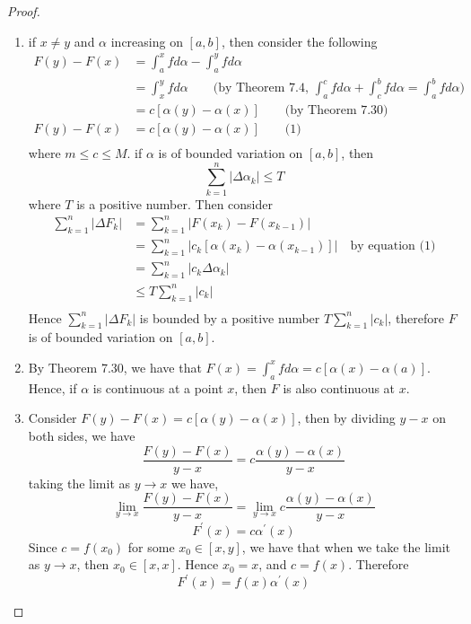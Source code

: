 \documentclass[aps,pra,notitlepage,amsmath,amssymb,letterpaper,12pt]{revtex4-1}
\begin{document}
\begin{proof}
\begin{enumerate}[\upshape a)]
\item if $x \ne y$ and $\alpha$ increasing on $[a,b]$, then consider the following
\begin{equation}
  \begin{split}
   F(y) - F(x)
   &= \int_{a}^{x} f d \alpha - \int_{a}^{y} f d \alpha \nonumber\\
   &= \int_{x}^{y} f d \alpha \qquad \textrm{(by Theorem 7.4, } \int_{a}^{c} f d \alpha + \int_{c}^{b} f d \alpha = \int_{a}^{b} f d \alpha) \nonumber \\
   &= c[\alpha(y) - \alpha(x)] \qquad \textrm{(by Theorem 7.30)}\\
   F(y) - F(x) &=  c[\alpha(y) - \alpha(x)] \qquad \textrm{(1)}\\
  \end{split}
 \end{equation}
where $m \leq c \leq M$. if $\alpha$ is of bounded variation on $[a,b]$, then
$$\sum_{k=1}^{n} \left| \Delta \alpha_{k} \right| \leq T$$
where $T$ is a positive number. Then consider
\begin{equation}
  \begin{split}
  \sum_{k=1}^{n} \left| \Delta F_{k} \right|
  &= \sum_{k=1}^{n} \left| F(x_{k})-F(x_{k-1}) \right| \nonumber\\
  &= \sum_{k=1}^{n} \left| c_{k}[\alpha(x_{k}) - \alpha(x_{k-1})] \right| \quad \textrm{by equation (1)} \\
  &= \sum_{k=1}^{n} \left| c_{k}\Delta \alpha_{k} \right| \\
  &\leq T\sum_{k=1}^{n} \left| c_{k} \right| \\
  \end{split}
\end{equation}
Hence $\sum_{k=1}^{n} \left| \Delta F_{k} \right|$ is bounded by a positive number $T\sum_{k=1}^{n} \left| c_{k} \right|$, therefore $F$ is of bounded variation on $[a,b]$.
\item By Theorem 7.30, we have that $F(x)=\int_{a}^{x} f d \alpha =  c[\alpha(x) - \alpha(a)]$. Hence, if $\alpha$ is continuous at a point $x$, then $F$ is also continuous at $x$.
\item Consider $F(y) - F(x) =  c[\alpha(y) - \alpha(x)]$, then by dividing $y-x$ on both sides, we have
$$\frac{F(y) - F(x)}{y-x} = c\frac{\alpha(y) - \alpha(x)}{y-x} $$
taking the limit as $y \to x$ we have,
$$\lim_{y \to x}\frac{F(y) - F(x)}{y-x}=\lim_{y \to x}c\frac{\alpha(y) - \alpha(x)}{y-x}$$
$$ F^\prime(x) = c \alpha^\prime(x) $$
Since $c = f(x_{0})$ for some $x_{0} \in [x,y]$, we have that when we take the limit as $y \to x$, then $x_{0} \in [x,x]$. Hence $x_{0} = x$, and $c = f(x)$. Therefore
$$ F^\prime(x) = f(x) \alpha^\prime(x) $$
\end{enumerate}
\end{proof}
\end{document}

